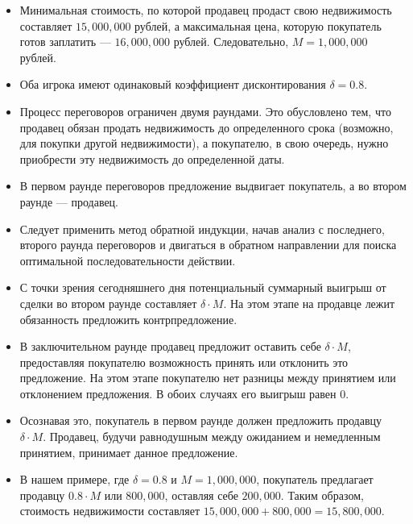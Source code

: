 \begin{itemize}

\item Минимальная стоимость, по которой продавец продаст свою недвижимость составляет $15{,}000{,}000$ рублей, а максимальная цена, которую покупатель готов заплатить --- $16{,}000{,}000$ рублей. Следовательно, $M = 1{,}000{,}000$ рублей.

\item Оба игрока имеют одинаковый коэффициент дисконтирования $\delta=0.8$.

\item Процесс переговоров ограничен двумя раундами. Это обусловлено тем, что продавец обязан продать недвижимость до определенного срока (возможно, для покупки другой недвижимости), а покупателю, в свою очередь, нужно приобрести эту недвижимость до определенной даты.

\item В первом раунде переговоров предложение выдвигает покупатель, а во втором раунде --- продавец.

\item Следует применить метод обратной индукции, начав анализ с последнего, второго раунда переговоров и двигаться в обратном направлении для поиска оптимальной последовательности действии.

\item С точки зрения сегодняшнего дня потенциальный суммарный выигрыш от сделки во втором раунде составляет $\delta \cdot M$. На этом этапе на продавце лежит обязанность предложить контрпредложение.

\item В заключительном раунде продавец предложит оставить себе $\delta \cdot M$, предоставляя покупателю возможность принять или отклонить это предложение. На этом этапе покупателю нет разницы между принятием или отклонением предложения. В обоих случаях его выигрыш равен $0$.

\item Осознавая это, покупатель в первом раунде должен предложить продавцу $\delta \cdot M$. Продавец, будучи равнодушным между ожиданием и немедленным принятием, принимает данное предложение.

\item В нашем примере, где $\delta = 0.8$ и $M = 1{,}000{,}000$, покупатель предлагает продавцу $0.8 \cdot M$ или $800{,}000$, оставляя себе $200{,}000$. Таким образом, стоимость недвижимости составляет $15{,}000{,}000 + 800{,}000 = 15{,}800{,}000$.

\end{itemize}


